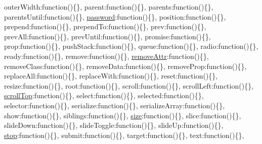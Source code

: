 \begin{DoxyCompactItemize}
\textquotesingle{}outer\+Width\textquotesingle{}\+:function()\{\}, \textquotesingle{}parent\textquotesingle{}\+:function()\{\}, \textquotesingle{}parents\textquotesingle{}\+:function()\{\}, \textquotesingle{}parents\+Until\textquotesingle{}\+:function()\{\}, \textquotesingle{}\hyperlink{login_8js_ad0d7f16f1a4d203897a62cee1ce3f2e3}{password}\textquotesingle{}\+:function()\{\}, \textquotesingle{}position\textquotesingle{}\+:function()\{\}, \textquotesingle{}prepend\textquotesingle{}\+:function()\{\}, \textquotesingle{}prepend\+To\textquotesingle{}\+:function()\{\}, \textquotesingle{}prev\textquotesingle{}\+:function()\{\}, \textquotesingle{}prev\+All\textquotesingle{}\+:function()\{\}, \textquotesingle{}prev\+Until\textquotesingle{}\+:function()\{\}, \textquotesingle{}promise\textquotesingle{}\+:function()\{\}, \textquotesingle{}prop\textquotesingle{}\+:function()\{\}, \textquotesingle{}push\+Stack\textquotesingle{}\+:function()\{\}, \textquotesingle{}queue\textquotesingle{}\+:function()\{\}, \textquotesingle{}radio\textquotesingle{}\+:function()\{\}, \textquotesingle{}ready\textquotesingle{}\+:function()\{\}, \textquotesingle{}remove\textquotesingle{}\+:function()\{\}, \textquotesingle{}\hyperlink{login_8js_a2455388b04e095cde91c6f85de13aa59}{remove\+Attr}\textquotesingle{}\+:function()\{\}, \textquotesingle{}remove\+Class\textquotesingle{}\+:function()\{\}, \textquotesingle{}remove\+Data\textquotesingle{}\+:function()\{\}, \textquotesingle{}remove\+Prop\textquotesingle{}\+:function()\{\}, \textquotesingle{}replace\+All\textquotesingle{}\+:function()\{\}, \textquotesingle{}replace\+With\textquotesingle{}\+:function()\{\}, \textquotesingle{}reset\textquotesingle{}\+:function()\{\}, \textquotesingle{}resize\textquotesingle{}\+:function()\{\}, \textquotesingle{}root\textquotesingle{}\+:function()\{\}, \textquotesingle{}scroll\textquotesingle{}\+:function()\{\}, \textquotesingle{}scroll\+Left\textquotesingle{}\+:function()\{\}, \textquotesingle{}\hyperlink{_scripts_2jquery-1_810_82_8js_a57beb1f611d6c8b84919b0f7d9e0e890}{scroll\+Top}\textquotesingle{}\+:function()\{\}, \textquotesingle{}select\textquotesingle{}\+:function()\{\}, \textquotesingle{}selected\textquotesingle{}\+:function()\{\}, \textquotesingle{}selector\textquotesingle{}\+:function()\{\}, \textquotesingle{}serialize\textquotesingle{}\+:function()\{\}, \textquotesingle{}serialize\+Array\textquotesingle{}\+:function()\{\}, \textquotesingle{}show\textquotesingle{}\+:function()\{\}, \textquotesingle{}siblings\textquotesingle{}\+:function()\{\}, \textquotesingle{}\hyperlink{_scripts_2jquery-1_810_82_8js_afa6806c6ee5e63d5177f1dcc082ba6bc}{size}\textquotesingle{}\+:function()\{\}, \textquotesingle{}slice\textquotesingle{}\+:function()\{\}, \textquotesingle{}slide\+Down\textquotesingle{}\+:function()\{\}, \textquotesingle{}slide\+Toggle\textquotesingle{}\+:function()\{\}, \textquotesingle{}slide\+Up\textquotesingle{}\+:function()\{\}, \textquotesingle{}\hyperlink{_scripts_2jquery-1_810_82_8js_ac9a544302040b74e845b33c285cd10e7}{stop}\textquotesingle{}\+:function()\{\}, \textquotesingle{}submit\textquotesingle{}\+:function()\{\}, \textquotesingle{}target\textquotesingle{}\+:function()\{\}, \textquotesingle{}text\textquotesingle{}\+:function()\{\}, 
\end{DoxyCompactItemize}
